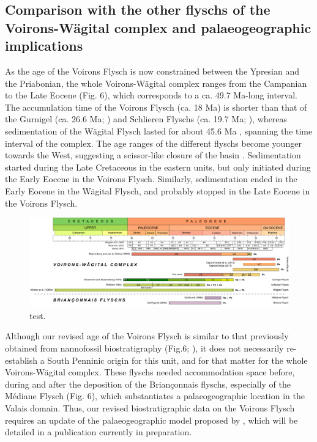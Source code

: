 \documentclass[twoside]{article}
\begin{document}
\subsection{Comparison with the other flyschs of the Voirons-Wägital complex and palaeogeographic implications}

As the age of the Voirons Flysch is now constrained between the Ypresian and the Priabonian, the whole Voirons-Wägital complex ranges from the Campanian to the Late Eocene (Fig. 6), which corresponds to a ca. 49.7 Ma-long interval. The accumulation time of the Voirons Flysch (ca. 18 Ma) is shorter than that of the Gurnigel (ca. 26.6 Ma; \citealp{Weidmann1976a,Morel1980b}) and Schlieren Flyschs (ca. 19.7 Ma; \citealp{Winkler1983,Winkler1984}), whereas sedimentation of the Wägital Flysch lasted for about 45.6 Ma \citep{Winkler1985a}, spanning the time interval of the complex. The age ranges of the different flyschs become younger towards the West, suggesting a scissor-like closure of the basin \citep{Winkler1984}. Sedimentation started during the Late Cretaceous in the eastern units, but only initiated during the Early Eocene in the Voirons Flysch. Similarly, sedimentation ended in the Early Eocene in the Wägital Flysch, and probably stopped in the Late Eocene in the Voirons Flysch.\par

	\begin{figure}[htp!]
		\centering
		\includegraphics[width=\textwidth]{Fig6.pdf}
		\caption{test.}
		\label{fig:Fig6}
	\end{figure}

Although our revised age of the Voirons Flysch is similar to that previously obtained from nannofossil biostratigraphy (Fig.6; \citealp{JanduChene1975c,Stuijvenberg1980b}), it does not necessarily re-establish a South Penninic origin for this unit, and for that matter for the whole Voirons-Wägital complex. These flyschs needed accommodation space before, during and after the deposition of the Briançonnais flyschs, especially of the Médiane Flysch (Fig. 6), which substantiates a palaeogeographic location in the Valais domain. Thus, our revised biostratigraphic data on the Voirons Flysch requires an update of the palaeogeographic model proposed by \cite{Ragusa2017a}, which will be detailed in a publication currently in preparation.\par
\end{document}
